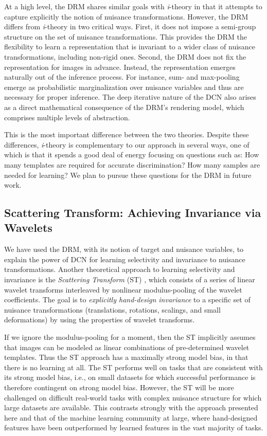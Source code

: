 \documentclass[12pt]{article}
\newcommand{\ith}[0]{{ \emph{i}-theory }}
\begin{document}
At a high level, the DRM shares similar goals with \ith in that it attempts to capture explicitly the notion of nuisance transformations. However, the DRM differs from \ith in two critical ways. First, it does not impose a semi-group structure on the set of nuisance transformations. This provides the DRM the flexibility to learn a representation that is invariant to a wider class of nuisance transformations, including non-rigid ones. Second, the DRM does not fix the representation for images in advance. Instead, the representation emerges naturally out of the inference process. For instance, sum- and max-pooling emerge as probabilistic marginalization over nuisance variables and thus are necessary for proper inference. The deep iterative nature of the DCN also arises as a direct mathematical consequence of the DRM's rendering model, which comprises multiple levels of abstraction.

This is the most important difference between the two theories. Despite these differences, \ith is complementary to our approach in several ways, one of which is that it spends a good deal of energy focusing on questions such as: How many templates are required for accurate discrimination? How many samples are needed for learning? We plan to pursue these questions for the DRM in future work.

\subsection{Scattering Transform: Achieving Invariance via Wavelets}

We have used the DRM, with its notion of target and nuisance variables, to explain the power of DCN for learning selectivity and invariance to nuisance transformations. Another theoretical approach to learning selectivity and invariance is the \emph{Scattering Transform} (ST) \cite{bruna2013invariant,mallat2012group}, which consists of a series of linear wavelet transforms interleaved by nonlinear modulus-pooling of the wavelet coefficients. The goal is to \emph{explicitly hand-design invariance} to a specific set of nuisance transformations (translations, rotations, scalings, and small deformations) by using the properties of wavelet transforms. 

If we ignore the modulus-pooling for a moment, then the ST implicitly assumes that images can be modeled as linear combinations of pre-determined wavelet templates. Thus the ST approach has a maximally strong model bias, in that there is no learning at all. The ST performs well on tasks that are consistent with its strong model bias, i.e., on small datasets for which successful performance is therefore contingent on strong model bias. However, the ST will be more challenged on difficult real-world tasks with complex nuisance structure for which large datasets are available. This contrasts strongly with the approach presented here and that of the machine learning community at large, where hand-designed features have been outperformed by learned features in the vast majority of tasks.
\end{document}

